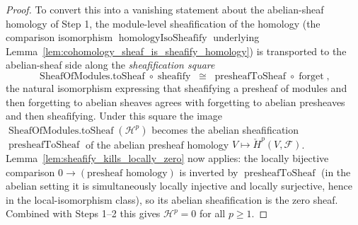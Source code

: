\begin{proof}
  To convert this into a vanishing statement about the abelian-sheaf homology of Step 1, the
  module-level sheafification of the homology (the comparison isomorphism
  \(\operatorname{homologyIsoSheafify}\) underlying
  Lemma~\ref{lem:cohomology_sheaf_is_sheafify_homology}) is transported to the abelian-sheaf side
  along the \emph{sheafification square}
  \[
    \operatorname{SheafOfModules.toSheaf} \circ \operatorname{sheafify}
      \;\cong\;
    \operatorname{presheafToSheaf} \circ \operatorname{forget},
  \]
  the natural isomorphism expressing that sheafifying a presheaf of modules and then forgetting to
  abelian sheaves agrees with forgetting to abelian presheaves and then sheafifying. Under this
  square the image \(\operatorname{SheafOfModules.toSheaf}(\mathcal{H}^p)\) becomes the abelian
  sheafification \(\operatorname{presheafToSheaf}\) of the abelian presheaf homology
  \(V \mapsto \check{H}^p(V, \mathcal{F})\). Lemma~\ref{lem:sheafify_kills_locally_zero} now applies:
  the locally bijective comparison \(0 \to (\text{presheaf homology})\) is inverted by
  \(\operatorname{presheafToSheaf}\) (in the abelian setting it is simultaneously locally injective
  and locally surjective, hence in the local-isomorphism class), so its abelian sheafification is the
  zero sheaf. Combined with Steps 1--2 this gives \(\mathcal{H}^p = 0\) for all \(p \geq 1\).


\end{proof}
